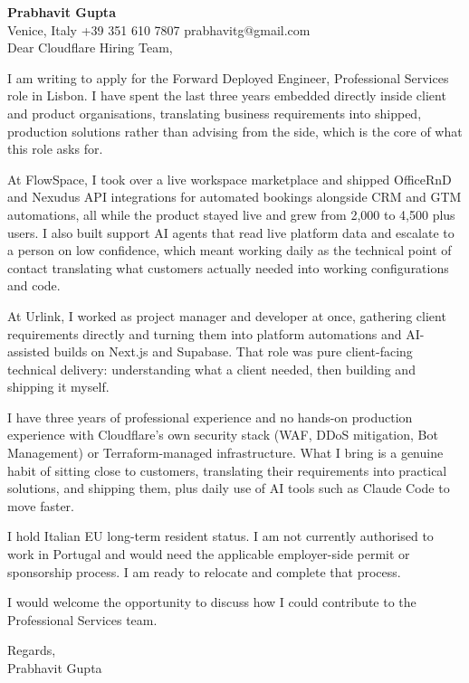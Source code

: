 \documentclass[a4paper,10.5pt]{article}
\begin{document}
\textbf{Prabhavit Gupta}\\
Venice, Italy \textbar{} +39 351 610 7807 \textbar{} prabhavitg@gmail.com\\[10pt]
Dear Cloudflare Hiring Team,

I am writing to apply for the Forward Deployed Engineer, Professional Services role in Lisbon. I have spent the last three years embedded directly inside client and product organisations, translating business requirements into shipped, production solutions rather than advising from the side, which is the core of what this role asks for.

At FlowSpace, I took over a live workspace marketplace and shipped OfficeRnD and Nexudus API integrations for automated bookings alongside CRM and GTM automations, all while the product stayed live and grew from 2,000 to 4,500 plus users. I also built support AI agents that read live platform data and escalate to a person on low confidence, which meant working daily as the technical point of contact translating what customers actually needed into working configurations and code.

At Urlink, I worked as project manager and developer at once, gathering client requirements directly and turning them into platform automations and AI-assisted builds on Next.js and Supabase. That role was pure client-facing technical delivery: understanding what a client needed, then building and shipping it myself.

I have three years of professional experience and no hands-on production experience with Cloudflare's own security stack (WAF, DDoS mitigation, Bot Management) or Terraform-managed infrastructure. What I bring is a genuine habit of sitting close to customers, translating their requirements into practical solutions, and shipping them, plus daily use of AI tools such as Claude Code to move faster.

I hold Italian EU long-term resident status. I am not currently authorised to work in Portugal and would need the applicable employer-side permit or sponsorship process. I am ready to relocate and complete that process.

I would welcome the opportunity to discuss how I could contribute to the Professional Services team.

Regards,\\
Prabhavit Gupta
\end{document}
